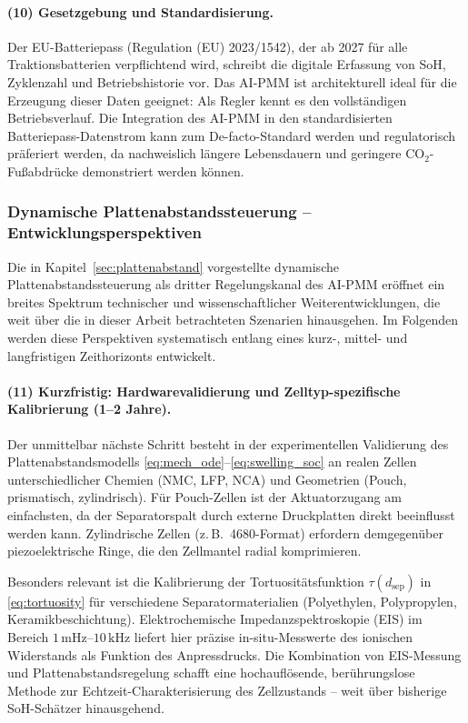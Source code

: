 ﻿\documentclass[12pt,a4paper]{article}
\begin{document}
	\paragraph{(10) Gesetzgebung und Standardisierung.}
	Der EU-Batteriepass (Regulation (EU) 2023/1542), der ab 2027 für alle
	Traktionsbatterien verpflichtend wird, schreibt die digitale Erfassung von
	SoH, Zyklenzahl und Betriebshistorie vor. Das AI-PMM ist architekturell
	ideal für die Erzeugung dieser Daten geeignet: Als Regler kennt es den
	vollständigen Betriebsverlauf. Die Integration des AI-PMM in den
	standardisierten Batteriepass-Datenstrom kann zum De-facto-Standard
	werden und regulatorisch präferiert werden, da nachweislich längere
	Lebensdauern und geringere CO$_2$-Fußabdrücke demonstriert werden können.

\subsubsection{Dynamische Plattenabstandssteuerung -- Entwicklungsperspektiven}

Die in Kapitel~\ref{sec:plattenabstand} vorgestellte dynamische Plattenabstandssteuerung
als dritter Regelungskanal des AI-PMM eröffnet ein breites Spektrum technischer
und wissenschaftlicher Weiterentwicklungen, die weit über die in dieser Arbeit
betrachteten Szenarien hinausgehen. Im Folgenden werden diese Perspektiven
systematisch entlang eines kurz-, mittel- und langfristigen Zeithorizonts
entwickelt.

\paragraph{(11) Kurzfristig: Hardwarevalidierung und Zelltyp-spezifische
	Kalibrierung (1--2 Jahre).}
Der unmittelbar nächste Schritt besteht in der experimentellen Validierung
des Plattenabstandsmodells \eqref{eq:mech_ode}--\eqref{eq:swelling_soc}
an realen Zellen unterschiedlicher Chemien (NMC, LFP, NCA) und Geometrien
(Pouch, prismatisch, zylindrisch). Für Pouch-Zellen ist der Aktuatorzugang
am einfachsten, da der Separatorspalt durch externe Druckplatten direkt
beeinflusst werden kann. Zylindrische Zellen (z.\,B.\ 4680-Format) erfordern
demgegenüber piezoelektrische Ringe, die den Zellmantel radial komprimieren.

Besonders relevant ist die Kalibrierung der Tortuositätsfunktion
$\tau(d_\mathrm{sep})$ in \eqref{eq:tortuosity} für verschiedene Separatormaterialien
(Polyethylen, Polypropylen, Keramikbeschichtung). Elektrochemische
Impedanzspektroskopie (EIS) im Bereich $1\,\mathrm{mHz}\text{--}10\,\mathrm{kHz}$
liefert hier präzise in-situ-Messwerte des ionischen Widerstands als Funktion
des Anpressdrucks. Die Kombination von EIS-Messung und Plattenabstandsregelung
schafft eine hochauflösende, berührungslose Methode zur Echtzeit-Charakterisierung
des Zellzustands -- weit über bisherige SoH-Schätzer hinausgehend.
\end{document}
